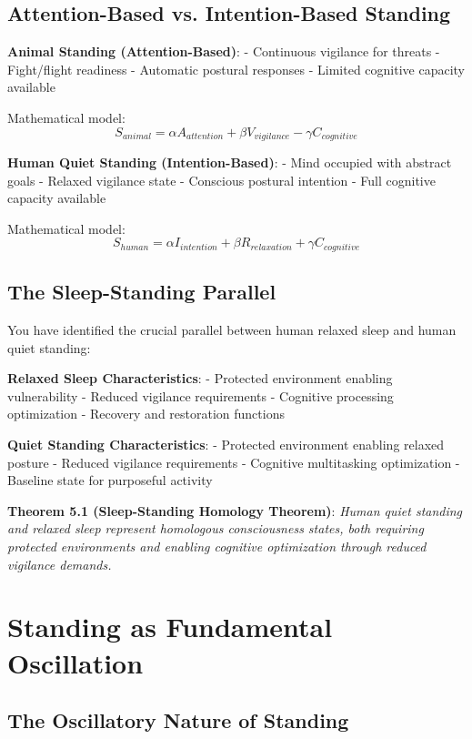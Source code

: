 \documentclass[12pt]{article}
\begin{document}
\subsection{Attention-Based vs. Intention-Based Standing}

\textbf{Animal Standing (Attention-Based)}:
- Continuous vigilance for threats
- Fight/flight readiness
- Automatic postural responses
- Limited cognitive capacity available

Mathematical model:
$$S_{animal} = \alpha A_{attention} + \beta V_{vigilance} - \gamma C_{cognitive}$$

\textbf{Human Quiet Standing (Intention-Based)}:
- Mind occupied with abstract goals
- Relaxed vigilance state
- Conscious postural intention
- Full cognitive capacity available

Mathematical model:
$$S_{human} = \alpha I_{intention} + \beta R_{relaxation} + \gamma C_{cognitive}$$

\subsection{The Sleep-Standing Parallel}

You have identified the crucial parallel between human relaxed sleep and human quiet standing:

\textbf{Relaxed Sleep Characteristics}:
- Protected environment enabling vulnerability
- Reduced vigilance requirements
- Cognitive processing optimization
- Recovery and restoration functions

\textbf{Quiet Standing Characteristics}:
- Protected environment enabling relaxed posture
- Reduced vigilance requirements
- Cognitive multitasking optimization
- Baseline state for purposeful activity

\textbf{Theorem 5.1 (Sleep-Standing Homology Theorem)}: \emph{Human quiet standing and relaxed sleep represent homologous consciousness states, both requiring protected environments and enabling cognitive optimization through reduced vigilance demands.}

\section{Standing as Fundamental Oscillation}

\subsection{The Oscillatory Nature of Standing}
\end{document}
